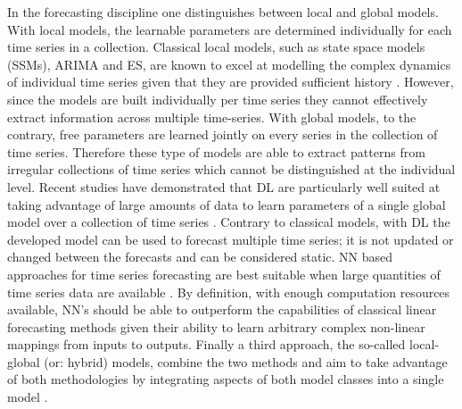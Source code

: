 \documentclass[format=sigconf, review=false, screen=true]{acmart}
\begin{document}
In the forecasting discipline one distinguishes between local and global models. With local models, the learnable parameters are determined individually for each time series in a collection. Classical local models, such as state space models (SSMs), ARIMA and ES, are known to excel at modelling the complex dynamics of individual time series given that they are provided sufficient history \cite{benidis2020neural}. However, since the models are built individually per time series they cannot effectively extract information across multiple time-series. With global models, to the contrary, free parameters are learned jointly on every series in the collection of time series. Therefore these type of models are able to extract patterns from irregular collections of time series which cannot be distinguished at the individual level. Recent studies have demonstrated that DL are particularly well suited at taking advantage of large amounts of data to learn parameters of a single global model over a collection of time series \cite{benidis2020neural}. Contrary to classical models, with DL the developed model can be used to forecast multiple time series; it is not updated or changed between the forecasts and can be considered static. NN based approaches for time series forecasting are best suitable when large quantities of time series data are available \cite{benidis2020neural}. By definition, with enough computation resources available, NN's should be able to outperform the capabilities of classical linear forecasting methods given their ability to learn arbitrary complex non-linear mappings from inputs to outputs. Finally a third approach, the so-called local-global (or: hybrid) models, combine the two methods and aim to take advantage of both methodologies by integrating aspects of both model classes into a single model \citep{benidis2020neural}. 
\end{document}
